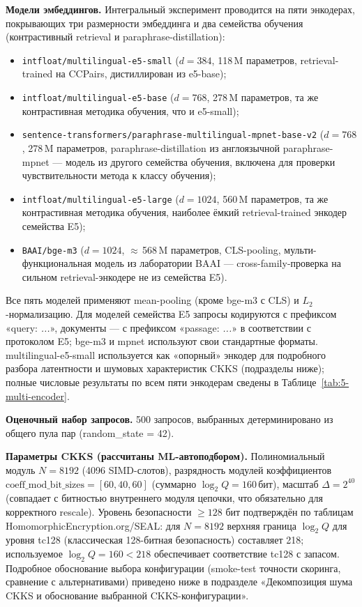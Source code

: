 \documentclass[a4paper, 12pt, oneside, openany]{article}
\begin{document}
\textbf{Модели эмбеддингов.} Интегральный эксперимент проводится на пяти энкодерах, покрывающих три размерности эмбеддинга и два семейства обучения (контрастивный retrieval и paraphrase-distillation):
\begin{itemize}
\item \texttt{intfloat/multilingual-e5-small} ($d = 384$, 118\,M параметров, retrieval-trained на CCPairs, дистиллирован из e5-base);
\item \texttt{intfloat/multilingual-e5-base} ($d = 768$, 278\,M параметров, та же контрастивная методика обучения, что и e5-small);
\item \texttt{sentence-transformers/paraphrase-multilingual-mpnet-base-v2} ($d = 768$, 278\,M параметров, paraphrase-distillation из англоязычной paraphrase-mpnet --- модель из другого семейства обучения, включена для проверки чувствительности метода к классу обучения);
\item \texttt{intfloat/multilingual-e5-large} ($d = 1024$, 560\,M параметров, та же контрастивная методика обучения, наиболее ёмкий retrieval-trained энкодер семейства E5);
\item \texttt{BAAI/bge-m3} ($d = 1024$, $\approx$\,568\,M параметров, CLS-pooling, мульти-функциональная модель из лаборатории BAAI --- cross-family-проверка на сильном retrieval-энкодере не из семейства E5).
\end{itemize}
Все пять моделей применяют mean-pooling (кроме bge-m3 с CLS) и $L_2$-нормализацию. Для моделей семейства E5 запросы кодируются с префиксом «query: \textit{...}», документы --- с префиксом «passage: \textit{...}» в соответствии с протоколом E5; bge-m3 и mpnet используют свои стандартные форматы. multilingual-e5-small используется как «опорный» энкодер для подробного разбора латентности и шумовых характеристик CKKS (подразделы ниже); полные числовые результаты по всем пяти энкодерам сведены в Таблице~\ref{tab:5-multi-encoder}.

\textbf{Оценочный набор запросов.} 500 запросов, выбранных детерминировано из общего пула пар (random\_state = 42). 

\textbf{Параметры CKKS (рассчитаны ML-автоподбором).} Полиномиальный модуль $N = 8192$ (4096 SIMD-слотов), разрядность модулей коэффициентов $\mathrm{coeff\_mod\_bit\_sizes} = [60, 40, 60]$ (суммарно $\log_{2} Q = 160$\,бит), масштаб $\Delta = 2^{40}$ (совпадает с битностью внутреннего модуля цепочки, что обязательно для корректного rescale). Уровень безопасности $\geq 128$ бит подтверждён по таблицам HomomorphicEncryption.org/SEAL: для $N = 8192$ верхняя граница $\log_{2} Q$ для уровня tc128 (классическая 128-битная безопасность) составляет 218; используемое $\log_{2} Q = 160 < 218$ обеспечивает соответствие tc128 с запасом. Подробное обоснование выбора конфигурации (smoke-test точности скоринга, сравнение с альтернативами) приведено ниже в подразделе «Декомпозиция шума CKKS и обоснование выбранной CKKS-конфигурации».
\end{document}
